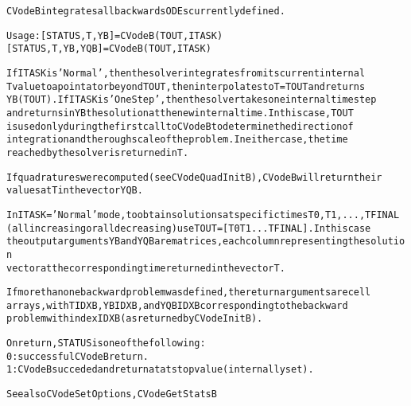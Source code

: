 \begin{alltt}
CVodeB integrates all backwards ODEs currently defined.

   Usage:  [STATUS, T, YB] = CVodeB ( TOUT, ITASK ) 
           [STATUS, T, YB, YQB] = CVodeB ( TOUT, ITASK )

   If ITASK is 'Normal', then the solver integrates from its current internal 
   T value to a point at or beyond TOUT, then interpolates to T = TOUT and returns 
   YB(TOUT). If ITASK is 'OneStep', then the solver takes one internal time step 
   and returns in YB the solution at the new internal time. In this case, TOUT 
   is used only during the first call to CVodeB to determine the direction of 
   integration and the rough scale of the problem. In either case, the time 
   reached by the solver is returned in T. 

   If quadratures were computed (see CVodeQuadInitB), CVodeB will return their
   values at T in the vector YQB.

   In ITASK =' Normal' mode, to obtain solutions at specific times T0,T1,...,TFINAL
   (all increasing or all decreasing) use TOUT = [T0 T1  ... TFINAL]. In this case
   the output arguments YB and YQB are matrices, each column representing the solution
   vector at the corresponding time returned in the vector T.

   If more than one backward problem was defined, the return arguments are cell
   arrays, with T{IDXB}, YB{IDXB}, and YQB{IDXB} corresponding to the backward
   problem with index IDXB (as returned by CVodeInitB).

   On return, STATUS is one of the following:
     0: successful CVodeB return.
     1: CVodeB succeded and return at a tstop value (internally set).

   See also CVodeSetOptions, CVodeGetStatsB
\end{alltt}






\vspace{0.1in}